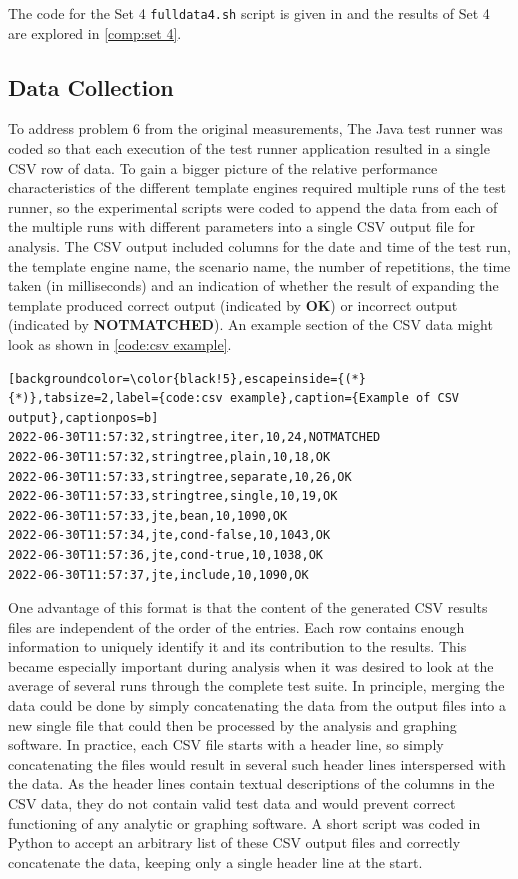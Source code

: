The code for the Set 4 \texttt{fulldata4.sh} script is given in  and the results of Set 4 are explored in \autoref{comp:set 4}.


\subsection{Data Collection}
\label{fs2:data}

To address problem 6 from the original measurements, The Java test runner was coded so that each execution of the test runner application resulted in a single CSV row of data. To gain a bigger picture of the relative performance characteristics of the different \gls{template engine}s required multiple runs of the test runner, so the experimental scripts were coded to append the data from each of the multiple runs with different parameters into a single CSV output file for analysis. The CSV output included columns for the date and time of the test run, the \gls{template engine} name, the scenario name, the number of repetitions, the time taken (in milliseconds) and an indication of whether the result of expanding the template produced correct output (indicated by \textbf{OK}) or incorrect output (indicated by \textbf{NOTMATCHED}). An example section of the CSV data might look as shown in \autoref{code:csv example}.

\begin{lstlisting}[backgroundcolor=\color{black!5},escapeinside={(*}{*)},tabsize=2,label={code:csv example},caption={Example of CSV output},captionpos=b]
2022-06-30T11:57:32,stringtree,iter,10,24,NOTMATCHED
2022-06-30T11:57:32,stringtree,plain,10,18,OK
2022-06-30T11:57:33,stringtree,separate,10,26,OK
2022-06-30T11:57:33,stringtree,single,10,19,OK
2022-06-30T11:57:33,jte,bean,10,1090,OK
2022-06-30T11:57:34,jte,cond-false,10,1043,OK
2022-06-30T11:57:36,jte,cond-true,10,1038,OK
2022-06-30T11:57:37,jte,include,10,1090,OK
\end{lstlisting}


One advantage of this format is that the content of the generated CSV results files are independent of the order of the entries. Each row contains enough information to uniquely identify it and its contribution to the results. This became especially important during analysis when it was desired to look at the average of several runs through the complete test suite. In principle, merging the data could be done by simply concatenating the data from the output files into a new single file that could then be processed by the analysis and graphing software. In practice, each CSV file starts with a header line, so simply concatenating the files would result in several such header lines interspersed with the data. As the header lines contain textual descriptions of the columns in the CSV data, they do not contain valid test data and would prevent correct functioning of any analytic or graphing software. A short script was coded in Python to accept an arbitrary list of these CSV output files and correctly concatenate the data, keeping only a single header line at the start.

